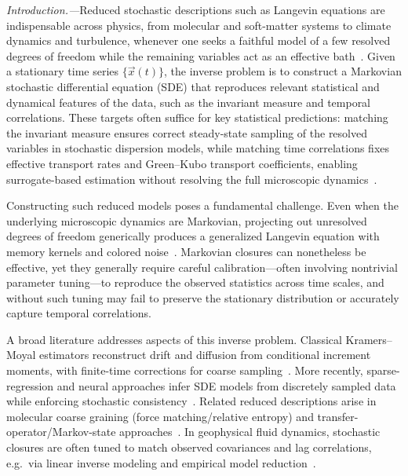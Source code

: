 \documentclass[%
  prl,
  reprint,
  amsmath,
  amssymb,
  aps
]{revtex4-2}
\newcommand{\vvec}[1]{\vec{#1}}
\begin{document}
\textit{Introduction.---}Reduced stochastic descriptions such as Langevin equations are indispensable across physics, from molecular and soft-matter systems to climate dynamics and turbulence, whenever one seeks a faithful model of a few resolved degrees of freedom while the remaining variables act as an effective bath~\cite{Risken1996,Zwanzig2001,PavliotisStuart2008,Hasselmann1976}.
Given a stationary time series $\{\vvec x(t)\}$, the inverse problem is to construct a Markovian stochastic differential equation (SDE) that reproduces relevant statistical and dynamical features of the data, such as the invariant measure and temporal correlations. These targets often suffice for key statistical predictions: matching the invariant measure ensures correct steady-state sampling of the resolved variables in stochastic dispersion models, while matching time correlations fixes effective transport rates and Green–Kubo transport coefficients, enabling surrogate-based estimation without resolving the full microscopic dynamics~\cite{Thomson1987JFM,Green1954JCP}.


Constructing such reduced models poses a fundamental challenge. Even when the underlying microscopic dynamics are Markovian, projecting out unresolved degrees of freedom generically produces a generalized Langevin equation with memory kernels and colored noise~\cite{Zwanzig1961,Mori1965}. Markovian closures can nonetheless be effective, yet they generally require careful calibration---often involving nontrivial parameter tuning---to reproduce the observed statistics across time scales, and without such tuning may fail to preserve the stationary distribution or accurately capture temporal correlations.

A broad literature addresses aspects of this inverse problem.
Classical Kramers--Moyal estimators reconstruct drift and diffusion from conditional increment moments, with finite-time corrections for coarse sampling~\cite{Siegert1998,Friedrich2000,RagwitzKantz2001}.
More recently, sparse-regression and neural approaches infer SDE models from discretely sampled data while enforcing stochastic consistency~\cite{Boninsegna2018,Callaham2021,Jacobs2023hypersindy,zhu2024dyngma,dietrich2023learning}.
Related reduced descriptions arise in molecular coarse graining (force matching/relative entropy) and transfer-operator/Markov-state approaches~\cite{IzvekovVoth2005,Shell2008,HusicNoe2018}.
In geophysical fluid dynamics, stochastic closures are often tuned to match observed covariances and lag correlations, e.g.\ via linear inverse modeling and empirical model reduction~\cite{PenlandSardeshmukh1995,Kondrashov2006,Penland89,MTV1,MTV2,KONDRASHOV201533,STROUNINE2010145,LucariniChekroun2023,KRAVTSOV,nan2019,keyes2023stochastic,giorgini2022non,falasca2025probing}.
\end{document}
